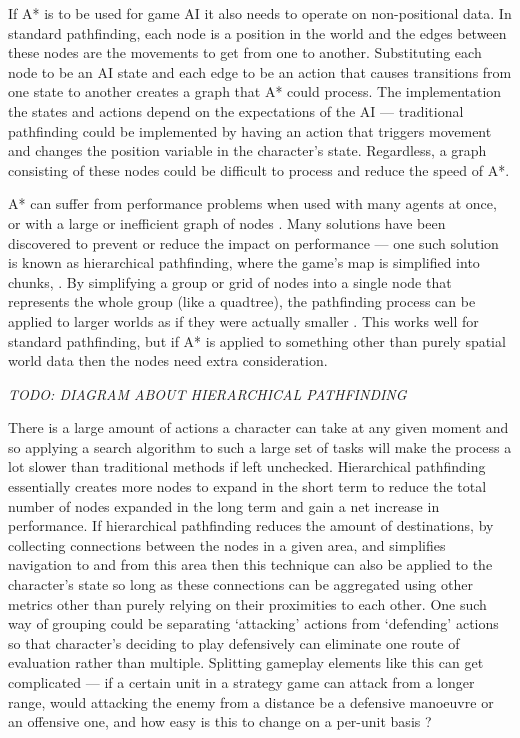 \documentclass[11pt, a4paper]{report}
\begin{document}
If A* is to be used for game AI it also needs to operate on non-positional data. In standard pathfinding, each node is a position in the world and the edges between these nodes are the movements to get from one to another. Substituting each node to be an AI state and each edge to be an action that causes transitions from one state to another creates a graph that A* could process. The implementation the states and actions depend on the expectations of the AI --- traditional pathfinding could be implemented by having an action that triggers movement and changes the position variable in the character's state. Regardless, a graph consisting of these nodes could be difficult to process and reduce the speed of A*.

A* can suffer from performance problems when used with many agents at once, or with a large or inefficient graph of nodes \parencite{graham2003pathfinding}. Many solutions have been discovered to prevent or reduce the impact on performance --- one such solution is known as hierarchical pathfinding, where the game's map is simplified into chunks, \parencite[126]{cui2011based}. By simplifying a group or grid of nodes into a single node that represents the whole group (like a quadtree), the pathfinding process can be applied to larger worlds as if they were actually smaller \parencite{botea2004near}. This works well for standard pathfinding, but if A* is applied to something other than purely spatial world data then the nodes need extra consideration. 

\emph{TODO: DIAGRAM ABOUT HIERARCHICAL PATHFINDING}

There is a large amount of actions a character can take at any given moment \parencite[62]{nareyek2004ai} and so applying a search algorithm to such a large set of tasks will make the process a lot slower than traditional methods if left unchecked. Hierarchical pathfinding essentially creates more nodes to expand in the short term to reduce the total number of nodes expanded in the long term and gain a net increase in performance. If hierarchical pathfinding reduces the amount of destinations, by collecting connections between the nodes in a given area, and simplifies navigation to and from this area then this technique can also be applied to the character's state so long as these connections can be aggregated using other metrics other than purely relying on their proximities to each other. One such way of grouping  could be separating `attacking' actions from `defending' actions so that character's deciding to play defensively can eliminate one route of evaluation rather than multiple. Splitting gameplay elements like this can get complicated --- if a certain unit in a strategy game can attack from a longer range, would attacking the enemy from a distance be a defensive manoeuvre or an offensive one, and how easy is this to change on a per-unit basis \parencite{weber2011building}?
\end{document}
